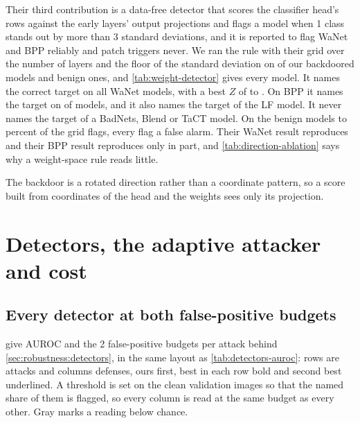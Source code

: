 Their third contribution is a data-free detector that scores the classifier head's rows against the early layers' output projections and flags a model when 1 class stands out by more than 3 standard deviations, and it is reported to flag WaNet and BPP reliably and patch triggers never. We ran the rule with their grid over the number of layers and the floor of the standard deviation on \WeightDetectorBackdoored{} of our backdoored models and \WeightDetectorBenign{} benign ones, and \cref{tab:weight-detector} gives every model. It names the correct target on all \WeightDetectorWanetModels{} WaNet models, with a best $Z$ of \WeightDetectorWanetBestZMin{} to \WeightDetectorWanetBestZMax{}. On BPP it names the target on \WeightDetectorBppNamed{} of \WeightDetectorBppModels{} models, and it also names the target of the \WeightDetectorLfModels{} LF model. It never names the target of a BadNets, Blend or TaCT model. On the benign models \WeightDetectorBenignFlagMin{} to \WeightDetectorBenignFlagMax{} percent of the grid flags, every flag a false alarm. Their WaNet result reproduces and their BPP result reproduces only in part, and \cref{tab:direction-ablation} says why a weight-space rule reads little.

 The backdoor is a rotated direction rather than a coordinate pattern, so a score built from coordinates of the head and the weights sees only its projection.


\FloatBarrier
\clearpage

\section{Detectors, the adaptive attacker and cost}
\label{app:robustness-group}

\subsection{Every detector at both false-positive budgets}
\label{app:detectors}

 give AUROC and the 2 false-positive budgets per attack behind \cref{sec:robustness:detectors}, in the same layout as \cref{tab:detectors-auroc}: rows are attacks and columns defenses, ours first, best in each row bold and second best underlined. A threshold is set on the \HeldoutSize{} clean validation images so that the named share of them is flagged, so every column is read at the same budget as every other. Gray marks a reading below chance.

